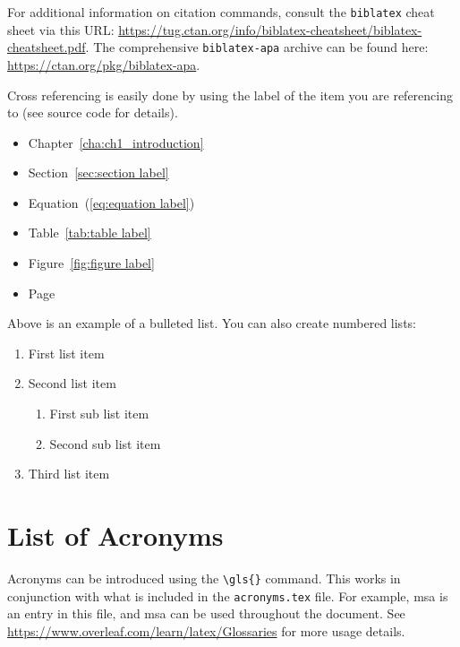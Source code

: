 
For additional information on citation commands, consult the \texttt{biblatex} cheat sheet via this URL: \url{https://tug.ctan.org/info/biblatex-cheatsheet/biblatex-cheatsheet.pdf}. The comprehensive \texttt{biblatex-apa} archive can be found here: \url{https://ctan.org/pkg/biblatex-apa}.

Cross referencing is easily done by using the label of the item you are referencing to (see source code for details).
\begin{itemize}
	\item Chapter~\ref{cha:ch1_introduction}
	\item Section~\ref{sec:section label}
	\item Equation~(\ref{eq:equation label})
	\item Table~\ref{tab:table label}
	\item Figure~\ref{fig:figure label}
	\item Page~\pageref{eq:equation label}
\end{itemize}

Above is an example of a bulleted list. You can also create numbered lists:
\begin{enumerate}
	\item First list item
	\item Second list item
	\begin{enumerate}
		\item First sub list item
		\item Second sub list item
	\end{enumerate}
	\item Third list item
\end{enumerate}

\section{List of Acronyms}
Acronyms can be introduced using the \verb|\gls{}| command. This works in conjunction with what is included in the \verb|acronyms.tex| file. For example, \gls{msa} is an entry in this file, and \gls{msa} can be used throughout the document. See \url{https://www.overleaf.com/learn/latex/Glossaries} for more usage details.